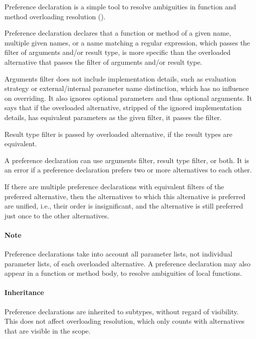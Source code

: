 Preference declaration is a simple tool to resolve ambiguities in function and method overloading resolution (). 

Preference declaration declares that a function or method of a given name, multiple given names, or a name matching a regular expression, which passes the filter of arguments and/or result type, is more specific than the overloaded alternative that passes the filter of arguments and/or result type. 

Arguments filter does not include implementation details, such as evaluation strategy or external/internal parameter name distinction, which has no influence on overriding. It also ignores optional parameters and thus optional arguments. It says that if the overloaded alternative, stripped of the ignored implementation details, has equivalent parameters as the given filter, it passes the filter.

Result type filter is passed by overloaded alternative, if the result types are equivalent. 

A preference declaration can use arguments filter, result type filter, or both. It is an error if a preference declaration prefers two or more alternatives to each other. 

If there are multiple preference declarations with equivalent filters of the preferred alternative, then the alternatives to which this alternative is preferred are unified, i.e., their order is insignificant, and the alternative is still preferred just once to the other alternatives. 

\paragraph{Note}
Preference declarations take into account all parameter lists, not individual parameter lists, of each overloaded alternative. A preference declaration may also appear in a function or method body, to resolve ambiguities of local functions. 

\paragraph{Inheritance}
Preference declarations are inherited to subtypes, without regard of visibility. This does not affect overloading resolution, which only counts with alternatives that are visible in the scope. 








